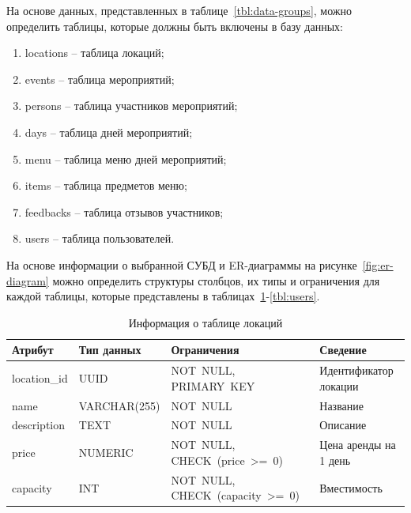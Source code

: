 На основе данных, представленных в таблице~\ref{tbl:data-groups}, можно определить таблицы, которые должны быть включены в базу данных:
\begin{enumerate}
	\item locations -- таблица локаций;
	\item events -- таблица мероприятий;
	\item persons -- таблица участников мероприятий;
	\item days -- таблица дней мероприятий;
	\item menu -- таблица меню дней мероприятий;
	\item items -- таблица предметов меню;
	\item feedbacks -- таблица отзывов участников;
	\item users -- таблица пользователей.
\end{enumerate}

На основе информации о выбранной СУБД и ER-диаграммы на рисунке~\ref{fig:er-diagram} можно определить структуры столбцов, их типы и ограничения для каждой таблицы, которые представлены в таблицах~\ref{tbl:locations}-\ref{tbl:users}.

\begin{table}[h!]
	\centering
	\caption{Информация о таблице локаций}
	\begin{tabularx}{\textwidth}{|p{2.6cm}|X|p{6cm}|X|}
		\hline
		\textbf{Атрибут} & \textbf{Тип данных} & \textbf{Ограничения} & \textbf{Сведение} \\
		\hline
		location\_id & UUID & NOT~NULL, \newline PRIMARY~KEY & Идентификатор локации \\
		\hline
		name & VARCHAR(255) & NOT~NULL & Название \\
		\hline
		description & TEXT & NOT~NULL & Описание \\
		\hline
		price & NUMERIC & NOT~NULL, \newline CHECK~(price~>=~0) & Цена аренды на 1 день \\
		\hline
		capacity & INT & NOT~NULL, \newline CHECK~(capacity~>=~0) & Вместимость \\
		\hline
	\end{tabularx}
	\label{tbl:locations}
\end{table}

